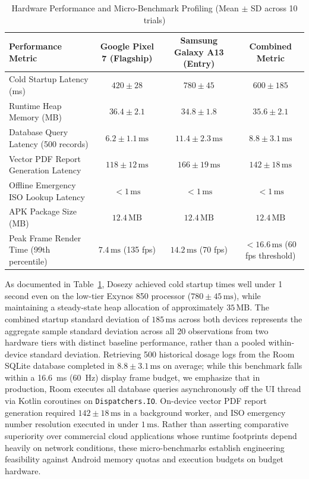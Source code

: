 \documentclass[11pt,a4paper]{article}
\begin{document}
\begin{table}[htbp]
\centering
\small
\caption{Hardware Performance and Micro-Benchmark Profiling (Mean $\pm$ SD across 10 trials)}
\label{tab:runtime_profiling}
\begin{tabular}{lccc}
\toprule
\textbf{Performance Metric} & \textbf{Google Pixel 7 (Flagship)} & \textbf{Samsung Galaxy A13 (Entry)} & \textbf{Combined Metric} \\
\midrule
Cold Startup Latency (ms) & $420 \pm 28$ & $780 \pm 45$ & $600 \pm 185$ \\
Runtime Heap Memory (MB) & $36.4 \pm 2.1$ & $34.8 \pm 1.8$ & $35.6 \pm 2.1$ \\
Database Query Latency (500 records) & $6.2 \pm 1.1\,\text{ms}$ & $11.4 \pm 2.3\,\text{ms}$ & $8.8 \pm 3.1\,\text{ms}$ \\
Vector PDF Report Generation Latency & $118 \pm 12\,\text{ms}$ & $166 \pm 19\,\text{ms}$ & $142 \pm 18\,\text{ms}$ \\
Offline Emergency ISO Lookup Latency & $< 1\,\text{ms}$ & $< 1\,\text{ms}$ & $< 1\,\text{ms}$ \\
APK Package Size (MB) & $12.4\,\text{MB}$ & $12.4\,\text{MB}$ & $12.4\,\text{MB}$ \\
Peak Frame Render Time (99th percentile) & $7.4\,\text{ms}$ (135 fps) & $14.2\,\text{ms}$ (70 fps) & $< 16.6\,\text{ms}$ (60 fps threshold) \\
\bottomrule
\end{tabular}
\end{table}

As documented in Table~\ref{tab:runtime_profiling}, Dosezy achieved cold startup times well under 1 second even on the low-tier Exynos 850 processor ($780 \pm 45\,\text{ms}$), while maintaining a steady-state heap allocation of approximately $35\,\text{MB}$. The combined startup standard deviation of $185\,\text{ms}$ across both devices represents the aggregate sample standard deviation across all 20 observations from two hardware tiers with distinct baseline performance, rather than a pooled within-device standard deviation. Retrieving 500 historical dosage logs from the Room SQLite database completed in $8.8 \pm 3.1\,\text{ms}$ on average; while this benchmark falls within a 16.6~ms (60~Hz) display frame budget, we emphasize that in production, Room executes all database queries asynchronously off the UI thread via Kotlin coroutines on \texttt{Dispatchers.IO}. On-device vector PDF report generation required $142 \pm 18\,\text{ms}$ in a background worker, and ISO emergency number resolution executed in under $1\,\text{ms}$. Rather than asserting comparative superiority over commercial cloud applications whose runtime footprints depend heavily on network conditions, these micro-benchmarks establish engineering feasibility against Android memory quotas and execution budgets on budget hardware.
\end{document}
